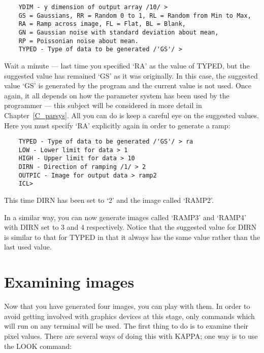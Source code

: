 \begin{small}
\begin{verbatim}
    YDIM - y dimension of output array /10/ > 
    GS = Gaussians, RR = Random 0 to 1, RL = Random from Min to Max,
    RA = Ramp across image, FL = Flat, BL = Blank,
    GN = Gaussian noise with standard deviation about mean, 
    RP = Poissonian noise about mean.
    TYPED - Type of data to be generated /'GS'/ > 
\end{verbatim}
\end{small}

Wait a minute --- last time you specified `RA' as the value of TYPED, but the
suggested value has remained `GS' as it was originally.
In this case, the suggested value `GS' is generated by the program and the
current value is not used.
Once again, it all depends on how the parameter system has been used by the
programmer --- this subject will be considered in more detail in
Chapter~\ref{C_parsys}.
All you can do is keep a careful eye on the suggested values.
Here you must specify `RA' explicitly again in order to generate a ramp:

\begin{small}
\begin{verbatim}
    TYPED - Type of data to be generated /'GS'/ > ra
    LOW - Lower limit for data > 1
    HIGH - Upper limit for data > 10
    DIRN - Direction of ramping /1/ > 2
    OUTPIC - Image for output data > ramp2
    ICL>
\end{verbatim}
\end{small}

This time DIRN has been set to `2' and the image  called `RAMP2'.

In a similar way, you can now generate images called `RAMP3' and `RAMP4' with
DIRN set to 3 and 4 respectively.
Notice that the suggested value for DIRN is similar to that for TYPED in that
it always has the same value rather than the last used value.

\section{Examining images}
\label{S_examimag}

Now that you have generated four images, you can play with them.
In order to avoid getting involved with graphics devices at this stage, only
commands which will run on any terminal will be used.
The first thing to do is to examine their pixel values.
There are several ways of doing this with KAPPA; one way is to use the LOOK
command:

